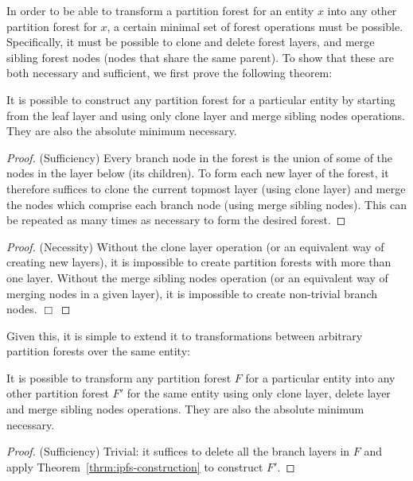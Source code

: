 In order to be able to transform a partition forest for an entity $x$ into any other partition forest for $x$, a certain minimal set of forest operations must be possible. Specifically, it must be possible to clone and delete forest layers, and merge sibling forest nodes (nodes that share the same parent). To show that these are both necessary and sufficient, we first prove the following theorem:

\newpage

\begin{theorem}
\label{thrm:ipfs-construction}
It is possible to construct any partition forest for a particular entity by starting from the leaf layer and using only clone layer and merge sibling nodes operations. They are also the absolute minimum necessary.
\end{theorem}

\begin{proof}
(Sufficiency) Every branch node in the forest is the union of some of the nodes in the layer below (its children). To form each new layer of the forest, it therefore suffices to clone the current topmost layer (using clone layer) and merge the nodes which comprise each branch node (using merge sibling nodes). This can be repeated as many times as necessary to form the desired forest.
\end{proof}

\begin{proof}
(Necessity) Without the clone layer operation (or an equivalent way of creating new layers), it is impossible to create partition forests with more than one layer. Without the merge sibling nodes operation (or an equivalent way of merging nodes in a given layer), it is impossible to create non-trivial branch nodes. $\Box$
\end{proof}

\noindent Given this, it is simple to extend it to transformations between arbitrary partition forests over the same entity:

\begin{theorem}
\label{thrm:ipfs-transformation}
It is possible to transform any partition forest $F$ for a particular entity into any other partition forest $F'$ for the same entity using only clone layer, delete layer and merge sibling nodes operations. They are also the absolute minimum necessary.
\end{theorem}

\begin{proof}
(Sufficiency) Trivial: it suffices to delete all the branch layers in $F$ and apply Theorem~\ref{thrm:ipfs-construction} to construct $F'$.
\end{proof}

